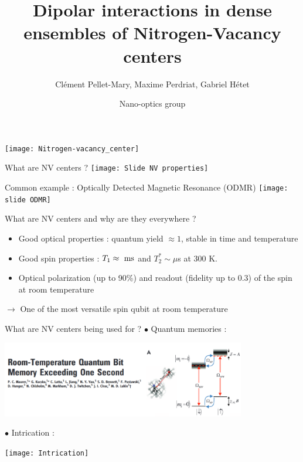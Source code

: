 \documentclass{beamer}
\title{Dipolar interactions in dense ensembles of Nitrogen-Vacancy centers}
\author{Clément Pellet-Mary, Maxime Perdriat, Gabriel Hétet}
\date{Nano-optics group}
\begin{document}
\begin{frame}
\maketitle
\centering
\texttt{[image: Nitrogen-vacancy\_center]}
\end{frame}
\begin{frame}{What are NV centers ?}
\centering
\texttt{[image: Slide  NV properties]}
\end{frame}
\begin{frame}{Common example : Optically Detected Magnetic Resonance (ODMR)}
\centering
\texttt{[image: slide ODMR]}
\end{frame}

\begin{frame}{What are NV centers and why are they everywhere ?}
\begin{itemize}
\item Good optical properties : quantum yield $\approx 1$, stable in time and temperature
\medskip
\item Good spin properties : $T_1\approx\ \rm ms$ and $T_2^*\sim \mu$s at 300 K.
\medskip
\item Optical polarization (up to 90\%) and readout (fidelity up to 0.3) of the spin at room temperature
\end{itemize}
\bigskip
$\to$ One of the most versatile spin qubit at room temperature
\end{frame}

\begin{frame}{What are NV centers being used for ?}
$\bullet$ Quantum memories :
\begin{center}
\includegraphics[width=0.8\textwidth,height=0.9\textheight,keepaspectratio]{mémoire}
\end{center}


$\bullet$ Intrication :
\begin{center}
\texttt{[image: Intrication]}
\end{center}
\end{frame}
\end{document}
